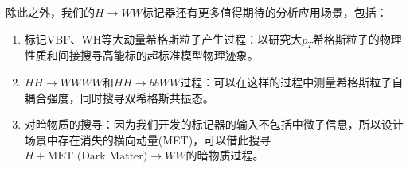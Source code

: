 除此之外，我们的$H\to WW$标记器还有更多值得期待的分析应用场景，包括：
\begin{enumerate}[$\bullet$]
    \item 标记VBF、WH等大动量希格斯粒子产生过程：以研究大$p_T$希格斯粒子的物理性质和间接搜寻高能标的超标准模型物理迹象。
    \item $HH\to WWWW$和$HH\to bbWW$过程：可以在这样的过程中测量希格斯粒子自耦合强度，同时搜寻双希格斯共振态。
    \item 对暗物质的搜寻：因为我们开发的标记器的输入不包括中微子信息，所以设计场景中存在消失的横向动量(MET)，可以借此搜寻$H+\text{MET (Dark Matter)}\to WW$的暗物质过程。
\end{enumerate}